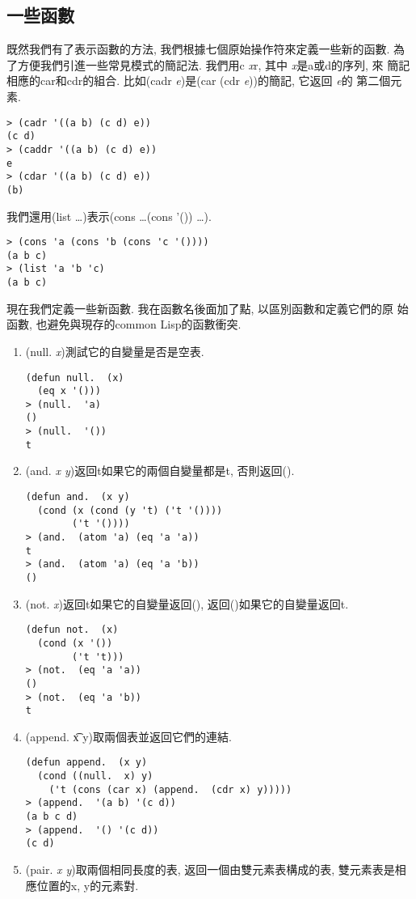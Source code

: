 \documentclass[12pt]{article}
\begin{document}
\begin{CJK}{UTF8}{bsmi}
\section{一些函數} 
既然我們有了表示函數的方法, 我們根據七個原始操作符來定義一些新的函數. 
為了方便我們引進一些常見模式的簡記法. 
我們用c{\it 
x}r, 其中{\it 
x}是a或d的序列, 來 
簡記相應的car和cdr的組合. 
比如(cadr 
{\it 
e})是(car 
(cdr 
{\it 
e}))的簡記, 它返回{\it 
e}的 
第二個元素. 
\begin{verbatim} 
> (cadr '((a b) (c d) e)) 
(c d) 
> (caddr '((a b) (c d) e)) 
e 
> (cdar '((a b) (c d) e)) 
(b) 
\end{verbatim} 
我們還用(list 
\eone\dots\en)表示(cons 
\eone\dots(cons 
\en 
'()) 
\dots). 
\begin{verbatim} 
> (cons 'a (cons 'b (cons 'c '()))) 
(a b c) 
> (list 'a 'b 'c) 
(a b c) 
\end{verbatim} 
現在我們定義一些新函數. 
我在函數名後面加了點, 以區別函數和定義它們的原 
始函數, 也避免與現存的common 
Lisp的函數衝突. 
\begin{enumerate} 
\item 
(null. 
{\it 
x})測試它的自變量是否是空表. 
\begin{verbatim} 
(defun null.  (x) 
  (eq x '())) 
> (null.  'a) 
() 
> (null.  '()) 
t 
\end{verbatim} 
\item 
(and. 
{\it 
x 
y})返回t如果它的兩個自變量都是t, 
否則返回(). 
\begin{verbatim} 
(defun and.  (x y) 
  (cond (x (cond (y 't) ('t '()))) 
        ('t '()))) 
> (and.  (atom 'a) (eq 'a 'a)) 
t 
> (and.  (atom 'a) (eq 'a 'b)) 
() 
\end{verbatim} 
\item 
(not. 
{\it 
x})返回t如果它的自變量返回(), 返回()如果它的自變量返回t. 
\begin{verbatim} 
(defun not.  (x) 
  (cond (x '()) 
        ('t 't))) 
> (not.  (eq 'a 'a)) 
() 
> (not.  (eq 'a 'b)) 
t 
\end{verbatim} 
\item 
(append. 
{\t 
x 
y})取兩個表並返回它們的連結. 
\begin{verbatim} 
(defun append.  (x y) 
  (cond ((null.  x) y) 
    ('t (cons (car x) (append.  (cdr x) y))))) 
> (append.  '(a b) '(c d)) 
(a b c d) 
> (append.  '() '(c d)) 
(c d) 
\end{verbatim} 
\item 
(pair. 
{\it 
x 
y})取兩個相同長度的表, 返回一個由雙元素表構成的表, 雙元素表是相 
應位置的x, y的元素對. 

\end{enumerate}
\end{CJK}
\end{document}
